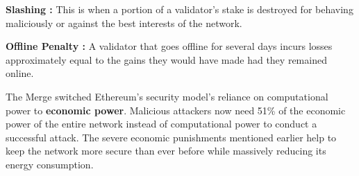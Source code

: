 \textbf{Slashing :}
This is when a portion of a validator's stake is destroyed for behaving maliciously or against the best interests of the network.

\textbf{Offline Penalty :}
A validator that goes offline for several days incurs losses approximately equal to the gains they would have made had they remained online. 

The Merge switched Ethereum's security model's reliance on  computational power to \textbf{economic power}. Malicious attackers now need 51\% of the economic power of the entire network instead of computational power to conduct a successful attack. The severe economic punishments mentioned earlier help to keep the network more secure than ever before while massively reducing its energy consumption. 







